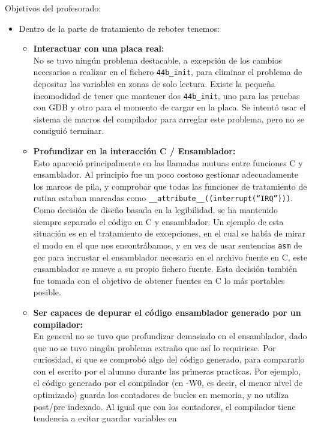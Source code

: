 \documentclass[12pt,letterpaper]{article}
\begin{document}
Objetivos del profesorado:
\begin{itemize}
\item Dentro de la parte de tratamiento de rebotes tenemos:
  \begin{itemize}
  \item \textbf{Interactuar con una placa real:}\\ No se tuvo ningún
    problema destacable, a excepción de los cambios necesarios a
    realizar en el fichero \texttt{44b\_init}, para eliminar el
    problema de depositar las variables en zonas de solo
    lectura. Existe la pequeña incomodidad de tener que mantener dos
    \texttt{44b\_init}, uno para las pruebas con GDB y otro para el
    momento de cargar en la placa. Se intentó usar el sistema de
    macros del compilador para arreglar este problema, pero no se
    consiguió terminar.
  \item \textbf{Profundizar en la interacción C / Ensamblador:}\\ Esto
    apareció principalmente en las llamadas mutuas entre funciones C y
    ensamblador. Al principio fue un poco costoso gestionar
    adecuadamente los marcos de pila, y comprobar que todas las
    funciones de tratamiento de rutina estaban marcadas como
    \texttt{\_\_attribute\_\_((interrupt(``IRQ'')))}. Como decisión de
    diseño basada en la legibilidad, se ha mantenido siempre separado
    el código en C y ensamblador. Un ejemplo de esta situación es en
    el tratamiento de excepciones, en el cual se había de mirar el
    modo en el que nos encontrábamos, y en vez de usar sentencias
    \texttt{asm} de gcc para incrustar el ensamblador necesario en el
    archivo fuente en C, este ensamblador se mueve a su propio fichero
    fuente. Esta decisión también fue tomada con el objetivo de
    obtener fuentes en C lo más portables posible.
  \item \textbf{Ser capaces de depurar el código ensamblador generado
    por un compilador:}\\ En general no se tuvo que profundizar
    demasiado en el ensamblador, dado que no se tuvo ningún problema
    extraño que así lo requiriese. Por curiosidad, si que se comprobó
    algo del código generado, para compararlo con el escrito por el
    alumno durante las primeras practicas. Por ejemplo, el código
    generado por el compilador (en -W0, es decir, el menor nivel de
    optimizado) guarda los contadores de bucles en memoria, y no
    utiliza post/pre indexado. Al igual que con los contadores, el
    compilador tiene tendencia a evitar guardar variables en

\end{itemize}
\end{itemize}
\end{document}
